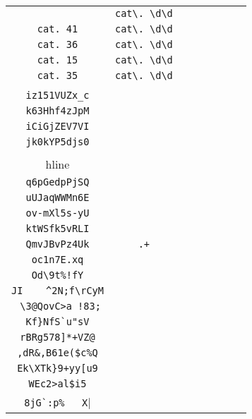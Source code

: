 \begin{longtable}{cccccccc}
\begin{tabular}{ll}
    \verb|cat. 60| & \verb|cat\. \d\d|\\
\verb|cat. 41| & \verb|cat\. \d\d|\\
\verb|cat. 36| & \verb|cat\. \d\d|\\
\verb|cat. 15| & \verb|cat\. \d\d|\\
\verb|cat. 35| & \verb|cat\. \d\d|
\end{tabular}
\\\midrule 
\begin{tabular}{l}
    \verb|YlBv6gDob-Y|\\
\verb|iz151VUZx_c|\\
\verb|k63Hhf4zJpM|\\
\verb|iCiGjZEV7VI|\\
\verb|jk0kYP5djs0|\\
\\hline\\
\verb|q6pGedpPjSQ|\\
\verb|uUJaqWWMn6E|\\
\verb|ov-mXl5s-yU|\\
\verb|ktWSfk5vRLI|\\
\verb|QmvJBvPz4Uk|
\end{tabular}

&
\verb|.+|
&

\begin{tabular}{l}
    \verb|(.)*.........|\\
\verb|oc1n7E.xq|\\
\verb|Od\9t%!fY|\\
\verb|JI	^2N;f\rCyM|\\
\verb| \3@QovC>a !83;|\\
\verb|Kf}NfS`u"sV|
\end{tabular}

&

\begin{tabular}{l}
    \verb|...(.)*(\d)*......|\\
\verb|rBRg578]*+VZ@|\\
\verb|,dR&,B61e($c%Q|\\
\verb|Ek\XTk}9+yy[u9|\\
\verb|WEc2>al$i5|\\
\verb|8jG`:p%	X|
\end{tabular}

&


\end{longtable}
